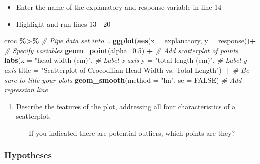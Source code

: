 \documentclass[
]{report}
\newenvironment{Shaded}{\begin{snugshade}}{\end{snugshade}}
\newcommand{\AttributeTok}[1]{\textcolor[rgb]{0.13,0.29,0.53}{#1}}
\newcommand{\CommentTok}[1]{\textcolor[rgb]{0.56,0.35,0.01}{\textit{#1}}}
\newcommand{\ConstantTok}[1]{\textcolor[rgb]{0.56,0.35,0.01}{#1}}
\newcommand{\FloatTok}[1]{\textcolor[rgb]{0.00,0.00,0.81}{#1}}
\newcommand{\FunctionTok}[1]{\textcolor[rgb]{0.13,0.29,0.53}{\textbf{#1}}}
\newcommand{\NormalTok}[1]{#1}
\newcommand{\SpecialCharTok}[1]{\textcolor[rgb]{0.81,0.36,0.00}{\textbf{#1}}}
\newcommand{\StringTok}[1]{\textcolor[rgb]{0.31,0.60,0.02}{#1}}
\providecommand{\tightlist}{%
  \setlength{\itemsep}{0pt}\setlength{\parskip}{0pt}}
\begin{document}
\begin{itemize}
\item
  Enter the name of the explanatory and response variable in line 14
\item
  Highlight and run lines 13 - 20
\end{itemize}

\newpage

\begin{Shaded}
\begin{Highlighting}[]
\NormalTok{croc }\SpecialCharTok{\%\textgreater{}\%} \CommentTok{\# Pipe data set into...}
\FunctionTok{ggplot}\NormalTok{(}\FunctionTok{aes}\NormalTok{(}\AttributeTok{x =}\NormalTok{ explanatory, }\AttributeTok{y =}\NormalTok{ response))}\SpecialCharTok{+}  \CommentTok{\# Specify variables}
  \FunctionTok{geom\_point}\NormalTok{(}\AttributeTok{alpha=}\FloatTok{0.5}\NormalTok{) }\SpecialCharTok{+}  \CommentTok{\# Add scatterplot of points}
  \FunctionTok{labs}\NormalTok{(}\AttributeTok{x =} \StringTok{"head width (cm)"}\NormalTok{,  }\CommentTok{\# Label x{-}axis}
       \AttributeTok{y =} \StringTok{"total length (cm)"}\NormalTok{,  }\CommentTok{\# Label y{-}axis}
       \AttributeTok{title =} \StringTok{"Scatterplot of Crocodilian Head Width vs. Total Length"}\NormalTok{) }\SpecialCharTok{+} 
    \CommentTok{\# Be sure to title your plots}
  \FunctionTok{geom\_smooth}\NormalTok{(}\AttributeTok{method =} \StringTok{"lm"}\NormalTok{, }\AttributeTok{se =} \ConstantTok{FALSE}\NormalTok{)  }\CommentTok{\# Add regression line}
\end{Highlighting}
\end{Shaded}

\begin{enumerate}
\def\labelenumi{\arabic{enumi}.}
\tightlist
\item
  Describe the features of the plot, addressing all four characteristics of a scatterplot.
\end{enumerate}

\vspace{1in}

~~~~~~~If you indicated there are potential outliers, which points are they?

\vspace{0.5in}

\subsubsection*{Hypotheses}\label{hypotheses}
\end{document}
